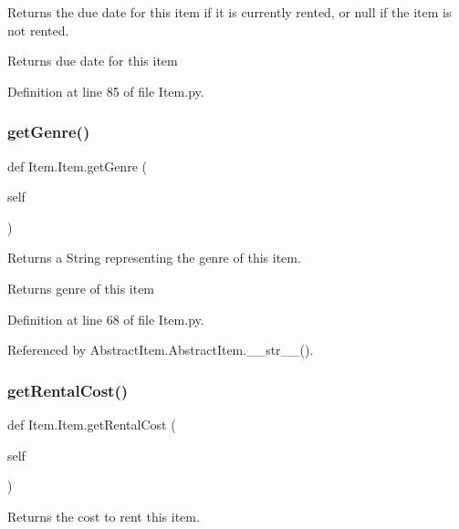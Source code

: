 Returns the due date for this item if it is currently rented, or null if the item is not rented. 

\begin{DoxyReturn}{Returns}
due date for this item 
\end{DoxyReturn}


Definition at line 85 of file Item.\+py.

\mbox{\label{classItem_1_1Item_a4f815eee80b9dffbbc0be9d79a0520ff}} 
\subsubsection{\texorpdfstring{get\+Genre()}{getGenre()}}
{\footnotesize\ttfamily def Item.\+Item.\+get\+Genre (\begin{DoxyParamCaption}\item[{}]{self }\end{DoxyParamCaption})}



Returns a String representing the genre of this item. 

\begin{DoxyReturn}{Returns}
genre of this item 
\end{DoxyReturn}


Definition at line 68 of file Item.\+py.



Referenced by Abstract\+Item.\+Abstract\+Item.\+\_\+\+\_\+str\+\_\+\+\_\+().

\mbox{\label{classItem_1_1Item_afe4448d1a099b956ecc0fc66ca22925d}} 
\subsubsection{\texorpdfstring{get\+Rental\+Cost()}{getRentalCost()}}
{\footnotesize\ttfamily def Item.\+Item.\+get\+Rental\+Cost (\begin{DoxyParamCaption}\item[{}]{self }\end{DoxyParamCaption})}



Returns the cost to rent this item. 

